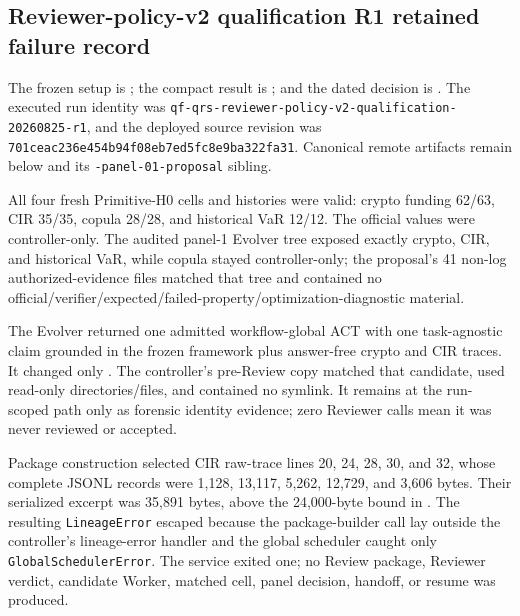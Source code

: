 \subsection{Reviewer-policy-v2 qualification R1 retained failure record}

The frozen setup is
; the
compact result is
;
and the dated decision is
.
The executed run identity was
\texttt{qf-qrs-reviewer-policy-v2-qualification-20260825-r1}, and the deployed
source revision was
\texttt{701ceac236e454b94f08eb7ed5fc8e9ba322fa31}. Canonical remote artifacts
remain below
and its \texttt{-panel-01-proposal} sibling.

All four fresh Primitive-H0 cells and histories were valid: crypto funding
62/63, CIR 35/35, copula 28/28, and historical VaR 12/12. The official values
were controller-only. The audited panel-1 Evolver tree exposed exactly crypto,
CIR, and historical VaR, while copula stayed controller-only; the proposal's
41 non-log authorized-evidence files matched that tree and contained no
official/verifier/expected/failed-property/optimization-diagnostic material.

The Evolver returned one admitted workflow-global ACT with one task-agnostic
claim grounded in the frozen framework plus answer-free crypto and CIR traces.
It changed only
. The controller's
pre-Review copy matched that candidate, used read-only directories/files, and
contained no symlink. It remains at the run-scoped
 path only as
forensic identity evidence; zero Reviewer calls mean it was never reviewed or
accepted.

Package construction selected CIR raw-trace lines 20, 24, 28, 30, and 32,
whose complete JSONL records were 1,128, 13,117, 5,262, 12,729, and 3,606
bytes. Their serialized excerpt was 35,891 bytes, above the 24,000-byte bound
in . The resulting
\texttt{LineageError} escaped because the package-builder call lay outside the
controller's lineage-error handler and the global scheduler caught only
\texttt{GlobalSchedulerError}. The service exited one; no Review package,
Reviewer verdict, candidate Worker, matched cell, panel decision, handoff, or
resume was produced.

